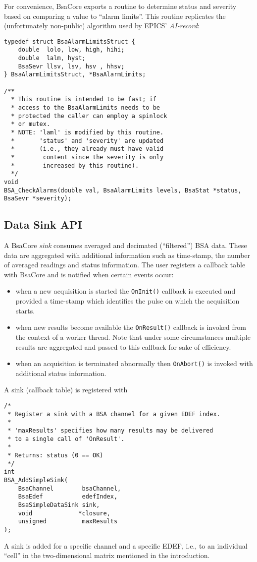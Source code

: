 \documentclass[11pt]{article}
\newcommand{\bsac}{BsaCore}
\newcommand{\bsa} {BSA}
\newcommand{\EDEF}{EDEF}
\newcommand{\cod}[1]{{\tt#1}}
\begin{document}
For convenience, \bsac{} exports a routine to determine status and severity based
on comparing a value to ``alarm limits''. This routine replicates the (unfortunately
non-public) algorithm used by EPICS' {\em AI-record}:
\begin{lstlisting}
typedef struct BsaAlarmLimitsStruct {
	double  lolo, low, high, hihi;
	double  lalm, hyst;
	BsaSevr llsv, lsv, hsv , hhsv;
} BsaAlarmLimitsStruct, *BsaAlarmLimits;

/**
  * This routine is intended to be fast; if
  * access to the BsaAlarmLimits needs to be
  * protected the caller can employ a spinlock
  * or mutex.
  * NOTE: 'laml' is modified by this routine.
  *       'status' and 'severity' are updated
  *       (i.e., they already must have valid
  *        content since the severity is only
  *        increased by this routine).
  */
void
BSA_CheckAlarms(double val, BsaAlarmLimits levels, BsaStat *status, BsaSevr *severity);
\end{lstlisting}

\subsection{Data Sink API}
A \bsac{} {\em sink} consumes averaged and decimated (``filtered'') \bsa{} data.
These data are aggregated with additional information such as time-stamp, the number
of averaged readings and status information.
The user registers a callback table with \bsac{} and is notified when certain
events occur:
\begin{itemize}
\item when a new acquisition is started the \cod{OnInit()} callback is executed
      and provided a time-stamp which identifies the pulse on which the acquisition
      starts.
\item when new results become available the \cod{OnResult()} callback is invoked
      from the context of a worker thread. Note that under some circumstances
      multiple results are aggregated and passed to this callback for sake of
      efficiency.
\item when an acquisition is terminated abnormally then \cod{OnAbort()} is invoked
      with additional status information.
\end{itemize}
A sink (callback table) is registered with
\begin{lstlisting}
/*
 * Register a sink with a BSA channel for a given EDEF index.
 *
 * 'maxResults' specifies how many results may be delivered
 * to a single call of 'OnResult'.
 *
 * Returns: status (0 == OK)
 */
int
BSA_AddSimpleSink(
    BsaChannel        bsaChannel,
    BsaEdef           edefIndex,
    BsaSimpleDataSink sink,
    void             *closure,
    unsigned          maxResults
);
\end{lstlisting}
A sink is added for a specific channel and a specific \EDEF{}, i.e.,
to an individual ``cell'' in the two-dimensional matrix mentioned in the introduction.
\end{document}
